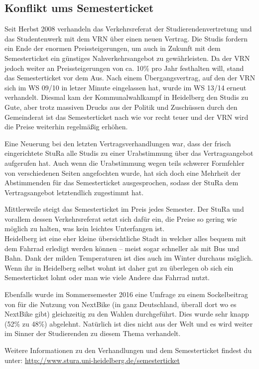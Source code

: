 \subsection{Konflikt ums Semesterticket}
Seit Herbst 2008 verhandeln das Verkehrsreferat der Studierendenvertretung und
das Studentenwerk mit dem VRN über einen neuen Vertrag. Die Studis fordern ein
Ende der enormen Preissteigerungen, um auch in Zukunft mit dem Semesterticket
ein günstiges Nahverkehrsangebot zu gewährleisten. Da der VRN jedoch weiter an
Preissteigerungen von ca. 10\% pro Jahr festhalten will, stand das
Semesterticket vor dem Aus. 
Nach einem Übergangsvertrag, auf den der VRN sich im WS 09/10 in letzer Minute
eingelassen hat, wurde im WS 13/14 erneut verhandelt. Diesmal kam der
Kommunalwahlkampf in Heidelberg den Studis zu Gute, aber trotz massiven Drucks
aus der Politik und Zuschüssen durch den Gemeinderat ist das Semesterticket
nach wie vor recht teuer und der VRN wird die Preise weiterhin regelmäßig
erhöhen.

Eine Neuerung bei den letzten Vertragsverhandlungen war, dass der frisch
eingerichtete \gls{StuRa} alle Studis zu einer Urabstimmung über das
Vertragsangebot aufgerufen hat. Auch wenn die Urabstimmung wegen teils schwerer
Formfehler von verschiedenen Seiten angefochten wurde, hat sich doch eine
Mehrheit der Abstimmenden für das Semesterticket ausgesprochen, sodass der
StuRa dem Vertragsangebot letztendlich zugestimmt hat.

Mittlerweile steigt das Semesterticket im Preis jedes Semester. Der StuRa und
vorallem dessen Verkehrsreferat setzt sich dafür ein, die Preise so gering wie
möglich zu halten, was kein leichtes Unterfangen ist.\\[1em]

Heidelberg ist eine eher kleine übersichtliche Stadt in welcher alles bequem
mit dem Fahrrad erledigt werden können -- meist sogar schneller als mit Bus und
Bahn. Dank der milden Temperaturen ist dies auch im Winter durchaus möglich.
Wenn ihr in Heidelberg selbst wohnt ist daher gut zu überlegen ob sich ein
Semesterticket lohnt oder man wie viele Andere das Fahrrad nutzt.

Ebenfalls wurde im Sommersemester 2016 eine Umfrage zu einem Sockelbeitrag von
 für die Nutzung von NextBike (in ganz Deutschland, überall dort wo
es NextBike gibt) gleichzeitig zu den Wahlen durchgeführt. Dies wurde sehr
knapp (52\% zu 48\%) abgelehnt. Natürlich ist dies nicht aus der Welt und es
wird weiter im Sinner der Studierenden zu diesem Thema verhandelt.

Weitere Informationen zu den Verhandlungen und dem Semesterticket findest du
unter: \url{http://www.stura.uni-heidelberg.de/semesterticket}




